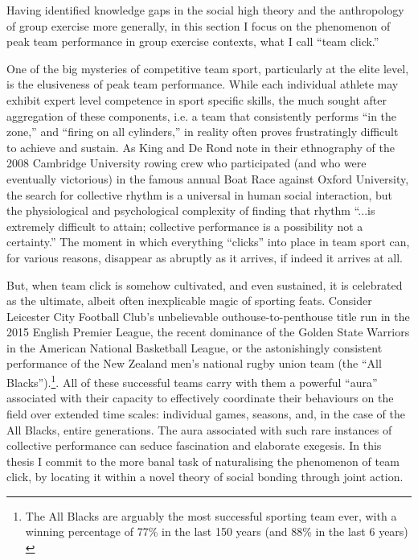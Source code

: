 \begin{CJK}{UTF8}{gbsn}
Having identified knowledge gaps in the social high theory and the anthropology of group exercise more generally, in this section I focus on the phenomenon of peak team performance in group exercise contexts, what I call ``team click.''

One of the big mysteries of competitive team sport, particularly at the elite level, is the elusiveness of peak team performance.  While each individual athlete may exhibit expert level competence in sport specific skills, the much sought after aggregation of these components, i.e. a team that consistently performs ``in the zone,'' and ``firing on all cylinders,'' in reality often proves frustratingly difficult to achieve and sustain.  As King and De Rond \textcite[568]{King2011} note in their ethnography of the 2008 Cambridge University rowing crew who participated (and who were eventually victorious) in the famous annual Boat Race against Oxford University, the search for collective rhythm is a universal in human social interaction, but  the physiological and psychological complexity of finding that rhythm ``...is extremely difficult to attain; collective performance is a possibility not a certainty.''   The moment in which everything ``clicks'' into place in team sport can, for various reasons, disappear as abruptly as it arrives, if indeed it arrives at all.

But, when team click is somehow cultivated, and even sustained, it is celebrated as the ultimate, albeit often inexplicable magic of sporting feats. Consider Leicester City Football Club's unbelievable outhouse-to-penthouse title run in the 2015 English Premier League, the recent dominance of the Golden State Warriors in the American National Basketball League, or the astonishingly consistent performance of the New Zealand men's national rugby union team (the ``All Blacks'').\footnote{The All Blacks are arguably the most successful sporting team ever, with a winning percentage of 77\% in the last 150 years (and 88\% in the last 6 years) \citep{SOURCE}}.  All of these successful teams carry with them a powerful ``aura'' associated with their capacity to effectively coordinate their behaviours on the field over extended time scales: individual games, seasons, and, in the case of the All Blacks, entire generations.  The aura associated with such rare instances of collective performance can seduce fascination and elaborate exegesis.  In this thesis I commit to the more banal task of naturalising the phenomenon of team click, by locating it within a novel theory of social bonding through joint action.


\end{CJK}
